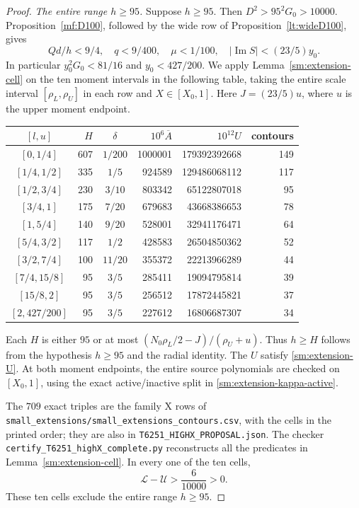 \documentclass[11pt,reqno]{amsart}
\numberwithin{equation}{section}
\theoremstyle{definition}
\theoremstyle{remark}
\renewcommand{\Im}{\operatorname{Im}}
\DeclareRobustCommand{\cert}[1]{\nolinkurl{#1}}
\begin{document}
\begin{proof}
\smallskip
\noindent\emph{The entire range $h\ge95$.}
Suppose $h\ge95$. Then $D^2>95^2G_0>10000$.
Proposition~\ref{mf:D100}, followed by the wide row of
Proposition~\ref{lt:wideD100}, gives
\[
 Qd/h<9/4,\quad q<9/400,\quad \mu<1/100,\quad
 |\Im S|<(23/5)y_0.
\]
In particular $y_0^2G_0<81/16$ and $y_0<427/200$.
We apply Lemma~\ref{sm:extension-cell} on the ten moment
intervals in the following table, taking the entire scale
interval $[\rho_L,\rho_U]$ in each row and $X\in[X_0,1]$.
Here $J=(23/5)u$, where $u$ is the upper moment endpoint.
\begin{center}\small
\begin{tabular}{c|rcrrr}
\toprule
$[l,u]$&$H$&$\delta$&$10^6\overline A$&$10^{12}U$&contours\\
\midrule
$[0,1/4]$&607&$1/200$&1000001&179392392668&149\\
$[1/4,1/2]$&335&$1/5$&924589&129486068112&117\\
$[1/2,3/4]$&230&$3/10$&803342&65122807018&95\\
$[3/4,1]$&175&$7/20$&679683&43668386653&78\\
$[1,5/4]$&140&$9/20$&528001&32941176471&64\\
$[5/4,3/2]$&117&$1/2$&428583&26504850362&52\\
$[3/2,7/4]$&100&$11/20$&355372&22213966289&44\\
$[7/4,15/8]$&95&$3/5$&285411&19094795814&39\\
$[15/8,2]$&95&$3/5$&256512&17872445821&37\\
$[2,427/200]$&95&$3/5$&227612&16806687307&34\\
\bottomrule
\end{tabular}
\end{center}
Each $H$ is either $95$ or at most
$(N_0\rho_L/2-J)/(\rho_U+u)$. Thus $h\ge H$ follows from
the hypothesis $h\ge95$ and the radial identity.
The $U$ satisfy \eqref{sm:extension-U}.
At both moment endpoints, the entire source polynomials
are checked on $[X_0,1]$, using the exact active/inactive
split in \eqref{sm:extension-kappa-active}.

The $709$ exact triples are the family \textup{X} rows of
\cert{small_extensions/small_extensions_contours.csv},
with the cells in the printed order; they are also in
\cert{T6251_HIGHX_PROPOSAL.json}.
The checker \cert{certify_T6251_highX_complete.py}
reconstructs all the predicates in
Lemma~\ref{sm:extension-cell}. In every one of the ten cells,
\[
 \mathcal L-\mathcal U>\frac6{10000}>0.
\]
These ten cells exclude the entire range $h\ge95$.


\end{proof}
\end{document}
